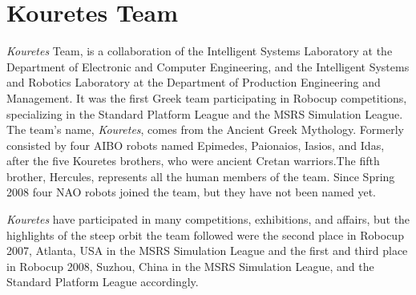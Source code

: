 \section{Kouretes Team}

{\em Kouretes} Team, is a collaboration of the Intelligent Systems Laboratory at the Department of Electronic and Computer Engineering, and the Intelligent Systems and Robotics Laboratory at the Department of Production Engineering and Management. It was the first Greek team participating in Robocup competitions, specializing in the Standard Platform League and the MSRS Simulation League. The team's name, {\em Kouretes}, comes from the Ancient Greek Mythology. Formerly consisted by four AIBO robots named Epimedes, Paionaios, Iasios, and Idas, after the five Kouretes brothers, who were ancient Cretan warriors.The fifth brother, Hercules, represents all the human members of the team. Since Spring 2008 four NAO robots joined the team, but they have not been named yet.

{\em Kouretes} have participated in many competitions, exhibitions, and affairs, but the highlights of the steep orbit the team followed were the second place in Robocup 2007, Atlanta, USA in the MSRS Simulation League and the first and third place in Robocup 2008, Suzhou, China in the MSRS Simulation League, and the Standard Platform League accordingly. 
%

